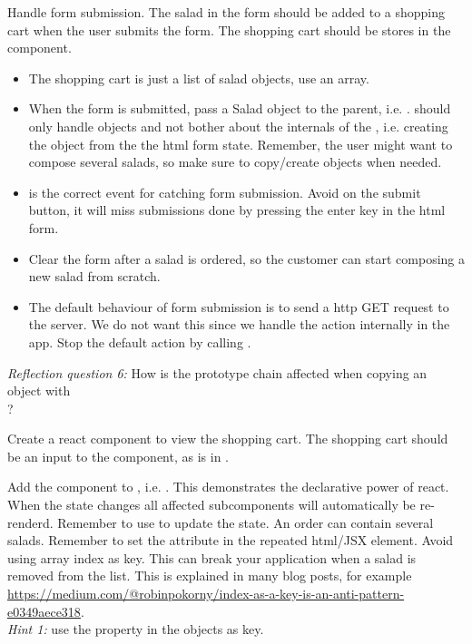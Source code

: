 \documentclass[fleqn, article, a4paper]{memoir}
\begin{document}
\begin{Assignments}
\item Handle form submission. The salad in the form should be added to a shopping cart when the user submits the form. The shopping cart should be stores in the  component.
\begin{itemize}
  \item The shopping cart is just a list of salad objects, use an array.
  \item When the form is submitted, pass a Salad object to the parent, i.e. .  should only handle  objects and not bother about the internals of the , i.e. creating the object from the the html form state. Remember, the user might want to compose several salads, so make sure to copy/create objects when needed.
  \item {} is the correct event for catching form submission. Avoid  on the submit button, it will miss submissions done by pressing the enter key in the html form.
  \item Clear the form after a salad is ordered, so the customer can start composing a new salad from scratch.
  \item The default behaviour of form submission is to send a http GET request to the server. We do not want this since we handle the action internally in the app. Stop the default action by calling .
\end{itemize}
\emph{Reflection question 6:} How is the prototype chain affected when copying an object with \\?

\item Create a react component to view the shopping cart. The shopping cart should be an input to the component, as  is in .

\item Add the  component to , i.e. . This demonstrates the declarative power of react. When the state changes all affected subcomponents will automatically be re-renderd. Remember to use  to update the state.
\newline
\newline
An order can contain several salads. Remember to set the  attribute in the repeated html/JSX element. Avoid using array index as key. This can break your application when a salad is removed from the list. This is explained in many blog posts, for example \url{https://medium.com/@robinpokorny/index-as-a-key-is-an-anti-pattern-e0349aece318}.
\\ \noindent \emph{Hint 1:} use the  property in the  objects as key.


\end{Assignments}
\end{document}
